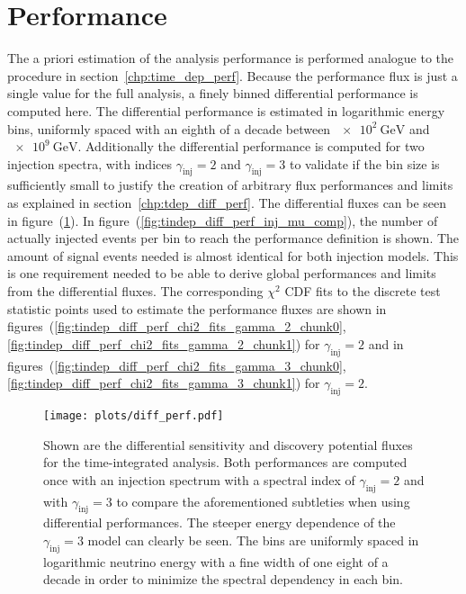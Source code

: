 \section{Performance}
The a priori estimation of the analysis performance is performed analogue to the procedure in section~\ref{chp:time_dep_perf}.
Because the performance flux is just a single value for the full analysis, a finely binned differential performance is computed here.
The differential performance is estimated in logarithmic energy bins, uniformly spaced with an eighth of a decade between $\SI{e2}{\GeV}$ and $\SI{e9}{\GeV}$.
Additionally the differential performance is computed for two injection spectra, with indices $\gamma_\text{inj} = 2$ and $\gamma_\text{inj} = 3$ to validate if the bin size is sufficiently small to justify the creation of arbitrary flux performances and limits as explained in section~\ref{chp:tdep_diff_perf}.
The differential fluxes can be seen in figure~(\ref{fig:tindep_diff_perf}).
In figure~(\ref{fig:tindep_diff_perf_inj_mu_comp}), the number of actually injected events per bin to reach the performance definition is shown.
The amount of signal events needed is almost identical for both injection models.
This is one requirement needed to be able to derive global performances and limits from the differential fluxes.
The corresponding $\chi^2$ CDF fits to the discrete test statistic points used to estimate the performance fluxes are shown in figures~(\ref{fig:tindep_diff_perf_chi2_fits_gamma_2_chunk0}, \ref{fig:tindep_diff_perf_chi2_fits_gamma_2_chunk1}) for $\gamma_\text{inj}=2$ and in figures~(\ref{fig:tindep_diff_perf_chi2_fits_gamma_3_chunk0}, \ref{fig:tindep_diff_perf_chi2_fits_gamma_3_chunk1}) for $\gamma_\text{inj}=2$.

\begin{figure}[htbp]
  \centering
  \texttt{[image: plots/diff\_perf.pdf]}
  \caption[Differential performance of the time-integrated analysis]{
    Shown are the differential sensitivity and discovery potential fluxes for the time-integrated analysis.
    Both performances are computed once with an injection spectrum with a spectral index of $\gamma_\text{inj}=2$ and with $\gamma_\text{inj}=3$ to compare the aforementioned subtleties when using differential performances.
    The steeper energy dependence of the $\gamma_\text{inj}=3$ model can clearly be seen.
    The bins are uniformly spaced in logarithmic neutrino energy with a fine width of one eight of a decade in order to minimize the spectral dependency in each bin.
  }
  \label{fig:tindep_diff_perf}
\end{figure}

